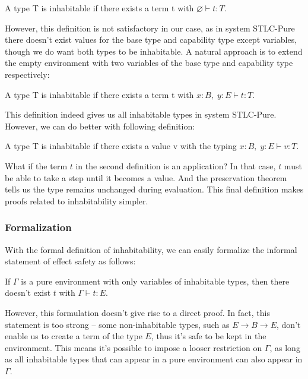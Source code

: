 \begin{definition}
  A type T is inhabitable if there exists a term t with $\varnothing
  \vdash t : T$.
\end{definition}

However, this definition is not satisfactory in our case, as in system
STLC-Pure there doesn't exist values for the base type and capability
type except variables, though we do want both types to be
inhabitable. A natural approach is to extend the empty environment
with two variables of the base type and capability type respectively:

\begin{definition}
  A type T is inhabitable if there exists a term t with
  $x:B,\; y:E \vdash t : T$.
\end{definition}

This definition indeed gives us all inhabitable types in system
STLC-Pure. However, we can do better with following definition:

\begin{definition}
  A type T is inhabitable if there exists a value v with the typing
  $x:B,\; y:E \vdash v : T$.
\end{definition}

What if the term $t$ in the second definition is an application? In that
case, $t$ must be able to take a step until it becomes a value. And the
preservation theorem tells us the type remains unchanged during
evaluation. This final definition makes proofs related to
inhabitability simpler.

\subsubsection{Formalization}

With the formal definition of inhabitability, we can easily formalize
the informal statement of effect safety as follows:

\begin{definition}
  If $\Gamma$ is a pure environment with only variables of inhabitable
  types, then there doesn't exist $t$ with $\Gamma \vdash t : E$.
\end{definition}

However, this formulation doesn't give rise to a direct proof. In
fact, this statement is too strong -- some non-inhabitable types, such
as $E \to B \to E$, don't enable us to create a term of the type $E$,
thus it's safe to be kept in the environment. This means it's possible
to impose a looser restriction on $\Gamma$, as long as all inhabitable
types that can appear in a pure environment can also appear in
$\Gamma$.

